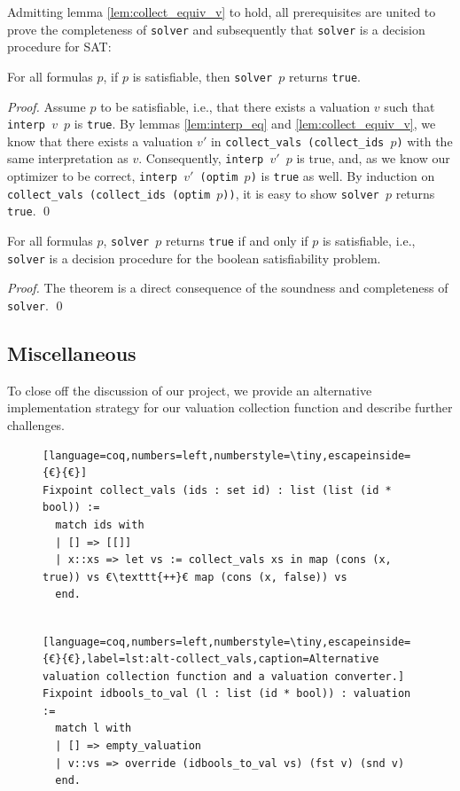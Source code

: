 Admitting lemma \ref{lem:collect_equiv_v} to hold, all prerequisites are united to prove the completeness of \texttt{solver} and subsequently that \texttt{solver} is a decision procedure for SAT:
\begin{lemma}
    For all formulas $p$, if $p$ is satisfiable, then \texttt{solver $p$} returns \texttt{true}.
\end{lemma}
\begin{proof}
    Assume $p$ to be satisfiable, i.e., that there exists a valuation $v$ such that \texttt{interp $v$ $p$} is \texttt{true}.
    By lemmas \ref{lem:interp_eq} and \ref{lem:collect_equiv_v}, we know that there exists a valuation $v'$ in \texttt{collect\_vals (collect\_ids $p$)} with the same interpretation as $v$.
    Consequently, \texttt{interp $v'$ $p$} is true, and, as we know our optimizer to be correct, \texttt{interp $v'$ (optim $p$)} is \texttt{true} as well.
    By induction on \texttt{collect\_vals (collect\_ids (optim $p$))}, it is easy to show \texttt{solver $p$} returns \texttt{true}. \qed
\end{proof}

\begin{theorem}
    For all formulas $p$, \texttt{solver $p$} returns \texttt{true} if and only if $p$ is satisfiable, i.e., \texttt{solver} is a decision procedure for the boolean satisfiability problem.
\end{theorem}
\begin{proof}
    The theorem is a direct consequence of the soundness and completeness of \texttt{solver}. \qed
\end{proof}

\subsection{Miscellaneous}

To close off the discussion of our project, we provide an alternative implementation strategy for our valuation collection function and describe further challenges.

\begin{figure}[t]
    \begin{lstlisting}[language=coq,numbers=left,numberstyle=\tiny,escapeinside={€}{€}]
Fixpoint collect_vals (ids : set id) : list (list (id * bool)) :=
  match ids with
  | [] => [[]]
  | x::xs => let vs := collect_vals xs in map (cons (x, true)) vs €\texttt{++}€ map (cons (x, false)) vs
  end.


    \end{lstlisting}
    \begin{lstlisting}[language=coq,numbers=left,numberstyle=\tiny,escapeinside={€}{€},label=lst:alt-collect_vals,caption=Alternative valuation collection function and a valuation converter.]
Fixpoint idbools_to_val (l : list (id * bool)) : valuation :=
  match l with
  | [] => empty_valuation
  | v::vs => override (idbools_to_val vs) (fst v) (snd v)
  end.
    \end{lstlisting}
\end{figure}

